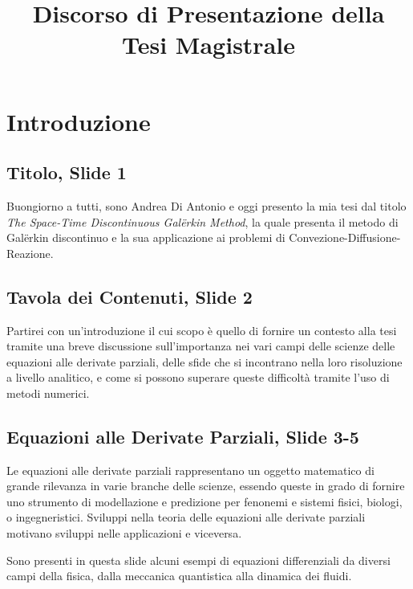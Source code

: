 \documentclass[12pt]{article}
\title{Discorso di Presentazione della Tesi Magistrale \\ \documenttitle}
\begin{document}

    \maketitle
    \tableofcontents


    \newpage
    
    \newpage
    \section{Introduzione}

    \subsection{Titolo, Slide 1}

    Buongiorno a tutti, sono Andrea Di Antonio e oggi presento la mia tesi dal titolo \textit{The Space-Time Discontinuous Galërkin Method}, la quale presenta il metodo di Galërkin discontinuo e la sua applicazione ai problemi di Convezione-Diffusione-Reazione.

    \subsection{Tavola dei Contenuti, Slide 2}

    Partirei con un'introduzione il cui scopo è quello di fornire un contesto alla tesi tramite una breve discussione sull'importanza nei vari campi delle scienze delle equazioni alle derivate parziali, delle sfide che si incontrano nella loro risoluzione a livello analitico, e come si possono superare queste difficoltà tramite l'uso di metodi numerici.

    \subsection{Equazioni alle Derivate Parziali, Slide 3-5}

    Le equazioni alle derivate parziali rappresentano un oggetto matematico di grande rilevanza in varie branche delle scienze, essendo queste in grado di fornire uno strumento di modellazione e predizione per fenonemi e sistemi fisici, biologi, o ingegneristici. Sviluppi nella teoria delle equazioni alle derivate parziali motivano sviluppi nelle applicazioni e viceversa.

    Sono presenti in questa slide alcuni esempi di equazioni differenziali da diversi campi della fisica, dalla meccanica quantistica alla dinamica dei fluidi.
\end{document}
